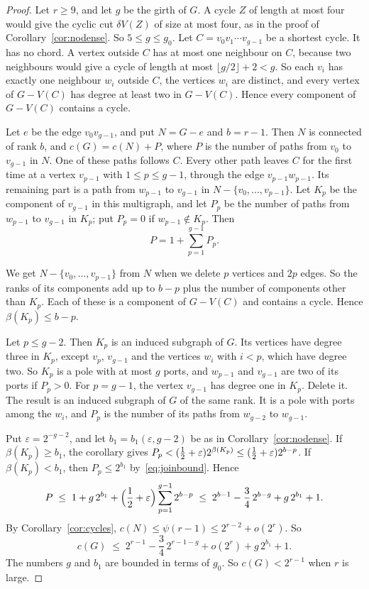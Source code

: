 \begin{proof}
Let $r\ge9$, and let $g$ be the girth of $G$. A cycle $Z$ of length at most four would give the
cyclic cut $\delta V(Z)$ of size at most four, as in the proof of Corollary~\ref{cor:nodense}. So
$5\le g\le g_0$. Let $C=v_0v_1\cdots v_{g-1}$ be a shortest cycle. It has no chord. A vertex
outside $C$ has at most one neighbour on $C$, because two neighbours would give a cycle of length
at most $\lfloor g/2\rfloor+2<g$. So each $v_i$ has exactly one neighbour $w_i$ outside $C$, the
vertices $w_i$ are distinct, and every vertex of $G-V(C)$ has degree at least two in $G-V(C)$.
Hence every component of $G-V(C)$ contains a cycle.

Let $e$ be the edge $v_0v_{g-1}$, and put $N=G-e$ and $b=r-1$. Then $N$ is connected of rank $b$,
and $c(G)=c(N)+P$, where $P$ is the number of paths from $v_0$ to $v_{g-1}$ in $N$. One of these
paths follows $C$. Every other path leaves $C$ for the first time at a vertex $v_{p-1}$ with
$1\le p\le g-1$, through the edge $v_{p-1}w_{p-1}$. Its remaining part is a path from $w_{p-1}$ to
$v_{g-1}$ in $N-\{v_0,\dots,v_{p-1}\}$. Let $K_p$ be the component of $v_{g-1}$ in this
multigraph, and let $P_p$ be the number of paths from $w_{p-1}$ to $v_{g-1}$ in $K_p$; put $P_p=0$
if $w_{p-1}\notin K_p$. Then
\[
  P=1+\sum_{p=1}^{g-1}P_p .
\]

 We get $N-\{v_0,\dots,v_{p-1}\}$ from $N$ when we delete $p$ vertices
and $2p$ edges. So the ranks of its components add up to $b-p$ plus the number of components
other than $K_p$. Each of these is a component of $G-V(C)$ and contains a cycle. Hence
$\beta(K_p)\le b-p$.

 Let $p\le g-2$. Then $K_p$ is an induced subgraph of $G$. Its vertices
have degree three in $K_p$, except $v_p$, $v_{g-1}$ and the vertices $w_i$ with $i<p$, which have
degree two. So $K_p$ is a pole with at most $g$ ports, and $w_{p-1}$ and $v_{g-1}$ are two of its
ports if $P_p>0$. For $p=g-1$, the vertex $v_{g-1}$ has degree one in $K_p$. Delete it. The result
is an induced subgraph of $G$ of the same rank. It is a pole with ports among the $w_i$, and $P_p$
is the number of its paths from $w_{g-2}$ to $w_{g-1}$.

 Put $\varepsilon=2^{-g-2}$, and let $b_1=b_1(\varepsilon,g-2)$ be as in
Corollary~\ref{cor:nodense}. If $\beta(K_p)\ge b_1$, the corollary gives
$P_p<(\tfrac12+\varepsilon)2^{\beta(K_p)}\le(\tfrac12+\varepsilon)2^{b-p}$. If $\beta(K_p)<b_1$, then
$P_p\le2^{b_1}$ by~\eqref{eq:joinbound}. Hence
\[
  P\;\le\;1+g\,2^{b_1}+\Bigl(\frac12+\varepsilon\Bigr)\sum_{p=1}^{g-1}2^{b-p}
  \;\le\;2^{b-1}-\frac34\,2^{b-g}+g\,2^{b_1}+1 .
\]
By Corollary~\ref{cor:cycles}, $c(N)\le\psi(r-1)\le2^{r-2}+o(2^{r})$. So
\[
  c(G)\;\le\;2^{r-1}-\frac34\,2^{r-1-g}+o(2^{r})+g\,2^{b_1}+1 .
\]
The numbers $g$ and $b_1$ are bounded in terms of $g_0$. So $c(G)<2^{r-1}$ when $r$ is large.
\end{proof}
